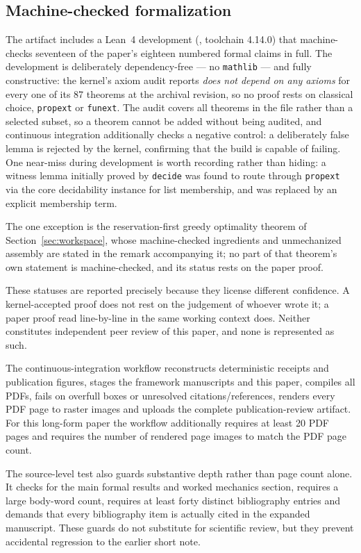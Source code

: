 \subsection{Machine-checked formalization}
\label{app:mechanization}

The artifact includes a Lean~4 development (, toolchain 4.14.0) that machine-checks seventeen of the paper's eighteen numbered formal claims in full. The development is deliberately dependency-free --- no \texttt{mathlib} --- and fully constructive: the kernel's axiom audit reports \emph{does not depend on any axioms} for every one of its 87 theorems at the archival revision, so no proof rests on classical choice, \texttt{propext} or \texttt{funext}. The audit covers all theorems in the file rather than a selected subset, so a theorem cannot be added without being audited, and continuous integration additionally checks a negative control: a deliberately false lemma is rejected by the kernel, confirming that the build is capable of failing. One near-miss during development is worth recording rather than hiding: a witness lemma initially proved by \texttt{decide} was found to route through \texttt{propext} via the core decidability instance for list membership, and was replaced by an explicit membership term.

The one exception is the reservation-first greedy optimality theorem of Section~\ref{sec:workspace}, whose machine-checked ingredients and unmechanized assembly are stated in the remark accompanying it; no part of that theorem's own statement is machine-checked, and its status rests on the paper proof.

These statuses are reported precisely because they license different confidence. A kernel-accepted proof does not rest on the judgement of whoever wrote it; a paper proof read line-by-line in the same working context does. Neither constitutes independent peer review of this paper, and none is represented as such.

The continuous-integration workflow reconstructs deterministic receipts and publication figures, stages the framework manuscripts and this paper, compiles all PDFs, fails on overfull boxes or unresolved citations/references, renders every PDF page to raster images and uploads the complete publication-review artifact. For this long-form paper the workflow additionally requires at least 20 PDF pages and requires the number of rendered page images to match the PDF page count.

The source-level test also guards substantive depth rather than page count alone. It checks for the main formal results and worked mechanics section, requires a large body-word count, requires at least forty distinct bibliography entries and demands that every bibliography item is actually cited in the expanded manuscript. These guards do not substitute for scientific review, but they prevent accidental regression to the earlier short note.


